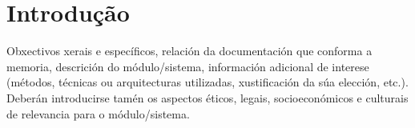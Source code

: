 \chapter{Introdução}

Obxectivos xerais e específicos, relación da documentación que conforma a memoria, descrición do módulo/sistema, información adicional de interese (métodos, técnicas ou arquitecturas utilizadas, xustificación da súa elección, etc.). Deberán introducirse tamén os aspectos éticos, legais, socioeconómicos e culturais de relevancia para o módulo/sistema.